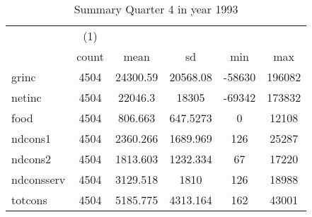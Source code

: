 \begin{table}[htbp]\centering
\def\sym#1{\ifmmode^{#1}\else\(^{#1}\)\fi}
\caption{Summary Quarter 4 in year 1993 \label{sum\_Q4\_y1993}}
\begin{tabular}{l*{1}{ccccc}}
\hline\hline
            &\multicolumn{1}{c}{(1)}&            &            &            &            \\
            &       count&        mean&          sd&         min&         max\\
\hline
grinc       &        4504&    24300.59&    20568.08&      -58630&      196082\\
netinc      &        4504&     22046.3&       18305&      -69342&      173832\\
food        &        4504&     806.663&    647.5273&           0&       12108\\
ndcons1     &        4504&    2360.266&    1689.969&         126&       25287\\
ndcons2     &        4504&    1813.603&    1232.334&          67&       17220\\
ndconsserv  &        4504&    3129.518&        1810&         126&       18988\\
totcons     &        4504&    5185.775&    4313.164&         162&       43001\\
\hline\hline
\end{tabular}
\end{table}

